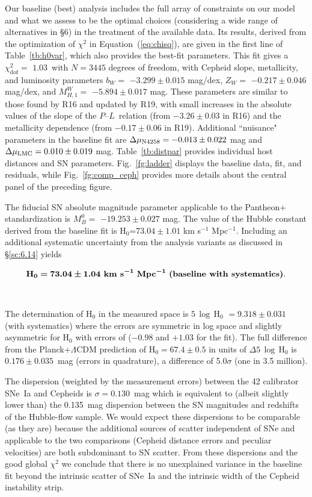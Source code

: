 \documentclass[12pt]{aastex631}
\newcommand{\bq}{\begin{equation}}
\newcommand{\eq}{\end{equation}}
\newcommand{\hbase}{$ 73.04 \pm 1.01 $ km s$^{-1}$ Mpc$^{-1}$}
\newcommand{\hsbaseq}{\bm{73.04 \pm 1.04} \textbf{\ km\ s}\bm{^{-1}}\ \textbf{Mpc}\bm{^{-1}}}
\newcommand{\chisqbase}{$1.03$}
\newcommand{\bslopebase}{$ -3.299 \pm 0.015$ mag/dex}
\newcommand{\gammabase}{$ -0.217 \pm 0.046$ mag/dex}
\newcommand{\mwbase}{$ -5.894 \pm 0.017$ mag}
\newcommand{\mbbase}{$ -19.253 \pm 0.027$ mag}
\newcommand{\PLs}{$P$--$L$\ }
\begin{document}
Our baseline (best) analysis includes the full array of constraints on our model and what we assess to be the optimal choices (considering a wide range of alternatives in \S6) in the treatment of the available data.  Its results, derived from the optimization of $\chi^2$ in Equation~(\ref{eq:chisq}), are given in the first line of Table~\ref{tb:h0var}, which also provides the best-fit parameters.  This fit gives a $\chi^2_\textrm{dof}=$ \chisqbase\, with $N=3445$ degrees of freedom, with Cepheid slope, metallicity, and luminosity parameters $b_W=$ \bslopebase, $Z_W=$ \gammabase, and $M_{H,1}^W=$ \mwbase. These parameters are similar to those found by R16 and updated by R19, with small increases in the absolute values of the slope of the \PLs relation (from $-3.26 \pm 0.03$ in R16) and the metallicity dependence (from $-0.17 \pm 0.06$ in R19). 
 Additional ``nuisance" parameters in the baseline fit are $\Delta \mu_{\rm N4258}=-0.013 \pm 0.022$ mag and $\Delta \mu_{\rm LMC}=0.010 \pm 0.019$ mag. 
Table~\ref{tb:distpar} provides individual host distances and SN parameters. Fig.~\ref{fg:ladder} displays the baseline data, fit, and residuals, while Fig.~\ref{fg:comp_ceph} provides more details about the central panel of the preceding figure.  

The fiducial SN absolute magnitude parameter applicable to the Pantheon+ standardization \citep{Scolnic:2021,Brout:2022} is $M_B^0=$ \mbbase.
The value of the Hubble constant derived from the baseline fit is H$_0$=\hbase.  
Including an additional systematic uncertainty from the analysis variants as discussed in \S\ref{sc:6.14} yields

\bq {\textbf H}\bm{_0}\bm{=}\hsbaseq\ \textbf{(baseline with systematics)}.\eq

\ \par

The determination of H$_0$ in the measured space is $5\,\log$\,H$_0$ $= 9.318 \pm 0.031$ (with systematics) where the errors are symmetric in log space and slightly asymmetric for H$_0$ with errors of ($-0.98$ and $+1.03$ for the fit).  The full difference from the Planck+$\Lambda$CDM prediction of H$_0=67.4 \pm 0.5$ \citep{Planck:2018} in units of $\Delta 5\,\log$\,H$_0$ is $0.176 \pm 0.035$~mag (errors in quadrature), a difference of 5.0$\sigma$ (one in 3.5 million). 

The dispersion (weighted by the measurement errors) between the 42 calibrator SNe~Ia and Cepheids is $\sigma=0.130$~mag which is equivalent to (albeit slightly lower than) the 0.135~mag dispersion between the SN magnitudes and redshifts of the Hubble-flow sample.  We would expect these dispersions to be comparable (as they are) because the additional sources of scatter independent of SNe and applicable to the two comparisons (Cepheid distance errors and peculiar velocities) are both subdominant to SN scatter.  From these dispersions and the good global $\chi^2$ we conclude that there is no unexplained variance in the baseline fit beyond the intrinsic scatter of SNe~Ia and the intrinsic width of the Cepheid instability strip.  
\end{document}
